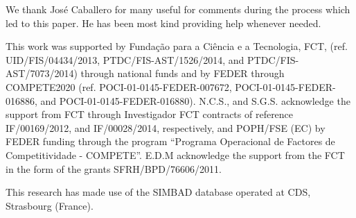 \documentclass{aa}
\begin{document}
\begin{acknowledgements}

We thank Jos\'e Caballero for many useful for comments during the process which
led to this paper. He has been most kind providing help whenever needed.

This work was supported by Funda\c{c}\~ao para a Ci\^encia e a Tecnologia, FCT,
(ref. UID/FIS/04434/2013, PTDC/FIS-AST/1526/2014, and PTDC/FIS-AST/7073/2014)
through national funds and by FEDER through COMPETE2020 (ref.
POCI-01-0145-FEDER-007672, POCI-01-0145-FEDER-016886, and
POCI-01-0145-FEDER-016880). N.C.S., and S.G.S. acknowledge the support from FCT
through Investigador FCT contracts of reference IF/00169/2012, and
IF/00028/2014, respectively, and POPH/FSE (EC) by FEDER funding through the
program “Programa Operacional de Factores de Competitividade - COMPETE”. E.D.M
acknowledge the support from the FCT in the form of the grants
SFRH/BPD/76606/2011.

This research has made use of the SIMBAD database operated at CDS, Strasbourg
(France).

\end{acknowledgements}




\end{document}
